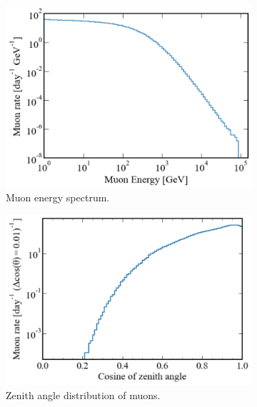 \begin{figure}[htbp]
    \centering
    \begin{subfigure}[b]{0.48\textwidth}
        \centering
        \includegraphics[width=\textwidth]{figures/Muons/Primary_energyLZstyle.pdf}
        \caption{Muon energy spectrum.}
        \label{fig:Prim_E}
    \end{subfigure}
    \begin{subfigure}[b]{0.49\textwidth}  
        \centering 
        \includegraphics[width=\textwidth]{figures/Muons/cosZ_LZstyle.pdf}
        \caption{Zenith angle distribution of muons.}
        \label{fig:cosZ}
    \end{subfigure}
    \begin{subfigure}[b]{0.49\textwidth}   

\end{subfigure}
\end{figure}
